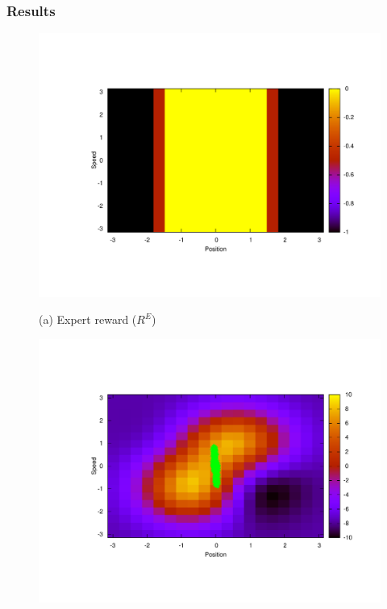 \documentclass[tablecaption=bottom]{jmlr}
\begin{document}
\subsubsection{Results}
\begin{figure}[ht]
\begin{center}
\begin{minipage}[b]{.48\linewidth}
  \centering
  \centerline{\includegraphics[width=\columnwidth]{LAFEM_Exp3_true_R.pdf}}
  \centerline{(a) Expert reward ($R^E$)}%
\end{minipage}
\begin{minipage}[b]{.48\linewidth}
  \centering
  \centerline{\includegraphics[width=\columnwidth]{LAFEM_Exp3_lafem_R.pdf}}

\end{minipage}
\end{center}
\end{figure}
\end{document}

